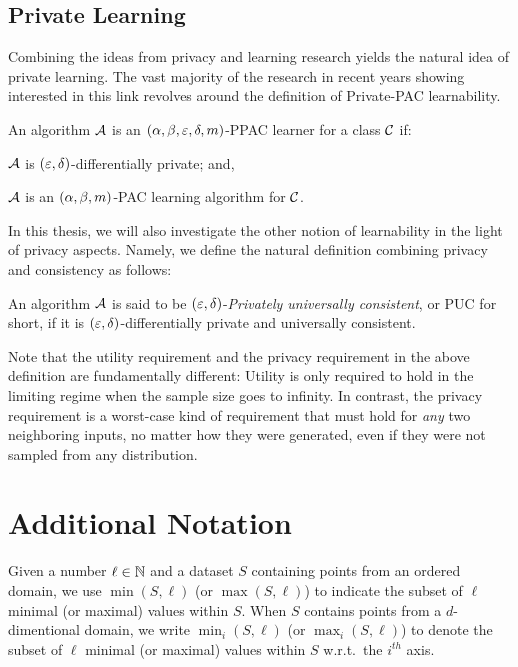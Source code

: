\documentclass[12pt,a4paper,oneside,onecolumn]{book}
\begin{document}
\subsection{Private Learning}


Combining the ideas from privacy and learning research yields the natural idea of private learning.
The vast majority of the research in recent years showing interested in this link 
revolves around the definition of Private-PAC learnability.
\begin{definition}
An algorithm $\mathcal{A}$ is an $(\alpha,\beta,\varepsilon,\delta,m)$-PPAC learner for a class $\mathcal{C}$ 
if: 
\begin{enumerate*}[label=(\roman*)]
    \item $\mathcal{A}$ is $(\varepsilon,\delta)$-differentially private; and,
    \item $\mathcal{A}$ is an $(\alpha,\beta,m)$-PAC learning algorithm for $\mathcal{C}$.
\end{enumerate*}
\end{definition}

In this thesis, we will also investigate the other notion of learnability in the light of privacy aspects. Namely, we define the natural definition combining privacy and consistency as follows:
\begin{definition}
An algorithm $\mathcal{A}$ is said to be $(\varepsilon,\delta)$-\emph{Privately universally consistent}, or PUC for short, 
if it is $(\varepsilon,\delta)$-differentially private and universally consistent.
\end{definition}

\begin{remark}
Note that the utility requirement and the privacy requirement in the above definition are fundamentally different: Utility is only required to hold in the limiting regime when the sample size goes to infinity. In contrast, the privacy requirement is a worst-case kind of requirement that must hold for {\em any} two neighboring inputs, no matter how they were generated, even if they were not sampled from any distribution. 
\end{remark}

\section{Additional Notation}

Given a number $\ell\in\mathbb{N}$ and a dataset $S$ containing points from an ordered domain,
we use $\min(S,\ell)$ (or $\max(S,\ell)$) 
to indicate the subset of $\ell$ minimal (or maximal) values within $S$.
When $S$ contains points from a $d$-dimentional domain, we write $\min_i(S,\ell)$ (or $\max_i(S,\ell)$) to denote the subset of $\ell$ minimal (or maximal) values within $S$ w.r.t.\ the $i^{th}$ axis.
\end{document}
